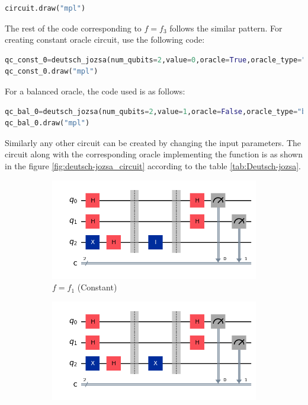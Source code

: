 \documentclass[12pt, oneside]{book}
\theoremstyle{definition}
\theoremstyle{definition}
\theoremstyle{remark}
\begin{document}
\begin{enumerate}
\begin{lstlisting}[language=Python]
circuit.draw("mpl")
    \end{lstlisting}
    The rest of the code corresponding to $f=f_3$ follows the similar pattern.
    For creating constant oracle circuit, use the following code:
    \begin{lstlisting}[language=Python]
qc_const_0=deutsch_jozsa(num_qubits=2,value=0,oracle=True,oracle_type="balanced",b_str="00")
qc_const_0.draw("mpl")
    \end{lstlisting}
    For a balanced oracle, the code used is as follows:
    \begin{lstlisting}[language=Python]
qc_bal_0=deutsch_jozsa(num_qubits=2,value=1,oracle=False,oracle_type="balanced",b_str="00")
qc_bal_0.draw("mpl")
    \end{lstlisting}
    Similarly any other circuit can be created by changing the input parameters.
    The circuit along with the corresponding oracle implementing the function is as shown in the figure \ref{fig:deutsch-jozsa_circuit} according to the table \ref{tab:Deutsch-jozsa}.
     \begin{figure}[H]
        \centering
        \begin{subfigure}[b]{0.45\linewidth}
        \centering
        \includegraphics[width=1\linewidth]{../images/deutsch_const_0.png}
        \caption{$f=f_1$ (Constant)}
        \label{fig:deutsch_jozsa_f1}
        \end{subfigure}
        \hfill
        \centering
        \begin{subfigure}[b]{0.45\linewidth}
        \centering
        \includegraphics[width=1\linewidth]{../images/deutsch_const_1.png}

\end{subfigure}
\end{figure}
\end{enumerate}
\end{document}
